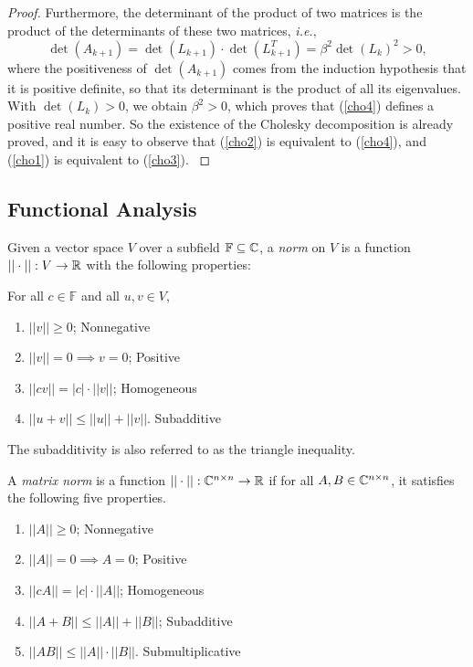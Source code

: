 \begin{proof}
Furthermore, the determinant of the product of two matrices is the product of the determinants of these two matrices, \textit{i.e.},
\[ \det(A_{k+1})=\det(L_{k+1})\cdot\det(L_{k+1}^T)=\beta^2\det(L_k)^2>0, \]
where the positiveness of \(\det(A_{k+1})\) comes from the induction hypothesis that it is positive definite, so that its determinant is the product of all its eigenvalues.
With \(\det(L_k)>0\), we obtain \(\beta^2>0\), which proves that (\ref{cho4}) defines a positive real number.
So the existence of the Cholesky decomposition is already proved, and it is easy to observe that (\ref{cho2}) is equivalent to (\ref{cho4}), and (\ref{cho1}) is equivalent to (\ref{cho3}).
\cite{tam37}
\end{proof}



\subsection{Functional Analysis}
\begin{definition}[Norm]
Given a vector space $V$ over a subfield \(\mathbb{F}\subseteq\mathbb{C}\), a \emph{norm} on $V$ is a function \(||\cdot||:V\to\mathbb{R}\) with the following properties:
\item For all \(c\in\mathbb{F}\) and all \(u,v\in V\),
\begin{enumerate}
	\item \(||v||\geq0\); \hfill Nonnegative
	\item \(||v||=0\implies v=0\); \hfill Positive
	\item \(||cv||=|c|\cdot||v||\); \hfill Homogeneous
	\item \(||u+v||\leq||u||+||v||\). \hfill Subadditive
\end{enumerate}
The subadditivity is also referred to as the triangle inequality.
\end{definition}


\begin{definition}
A \emph{matrix norm} is a function \(||\cdot||:\mathbb{C}^{n\times n}\to\mathbb{R}\) if for all \(A,B\in\mathbb{C}^{n\times n}\), it satisfies the following five properties.
\begin{enumerate}
	\item \(||A||\geq0\); \hfill Nonnegative
	\item \(||A||=0\implies A=0\); \hfill Positive
	\item \(||cA||=|c|\cdot||A||\); \hfill Homogeneous
	\item \(||A+B||\leq||A||+||B||\); \hfill Subadditive
	\item \(||AB||\leq||A||\cdot||B||\). \hfill Submultiplicative
\end{enumerate}
\cite{horn}
\end{definition}




